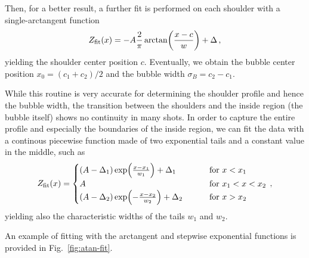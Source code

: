 Then, for a better result, a further fit is performed on each shoulder with a single-arctangent function
\begin{equation}
    Z_{\rm fit}(x) = -A \frac{2}{\pi}\arctan(\frac{x-c}{w}) + \Delta\, ,
    \label{eq:atan}
\end{equation}
yielding the shoulder center position $c$. Eventually, we obtain the bubble center position $x_0 = (c_1 + c_2)/2$ and the bubble width $\sigma_B = c_2 - c_1$.

While this routine is very accurate for determining the shoulder profile and hence the bubble width, the transition between the shoulders and the inside region (the bubble itself) shows no continuity in many shots. In order to capture the entire profile and especially the boundaries of the inside region, we can fit the data with a continous piecewise function made of two exponential tails and a constant value in the middle, such as
\begin{equation}
    Z_{\rm fit}(x) = 
    \begin{cases}
        (A-\Delta_1) \exp(\frac{x-x_1}{w_1}) + \Delta_1 \qquad\quad &\text{for } x < x_1\\
        A \qquad\qquad\qquad\qquad &\text{for } x_1 < x < x_2\\
        (A-\Delta_2) \exp(-\frac{x-x_2}{w_2}) + \Delta_2 \qquad &\text{for } x > x_2
    \end{cases}\, ,
    \label{eq:fit_exp}
\end{equation}
yielding also the characteristic widths of the tails $w_1$ and $w_2$.

An example of fitting with the arctangent and stepwise exponential functions is provided in Fig.\ \ref{fig:atan-fit}.

